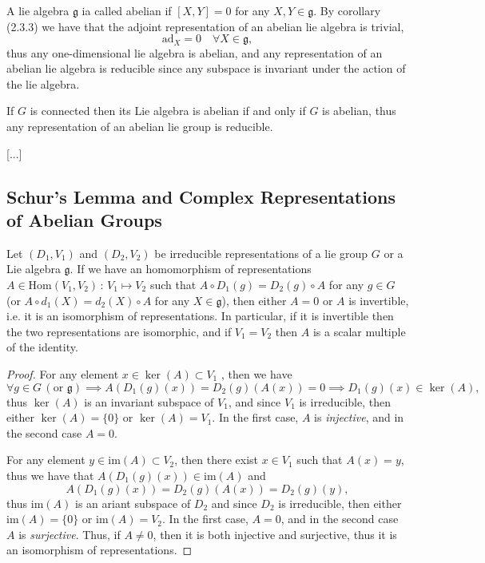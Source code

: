 \begin{definition}
    A lie algebra \(\mathfrak{g}\) ia called abelian if \([X, Y] = 0\) for any \(X, Y \in \mathfrak{g}\). By corollary (2.3.3) we have that the adjoint representation of an abelian lie algebra is trivial,
    \[
        \mathrm{ad}_X = 0 \quad \forall X \in \mathfrak{g},
    \]
    thus any one-dimensional lie algebra is abelian, and any representation of an abelian lie algebra is reducible since any subspace is invariant under the action of the lie algebra. 
\end{definition}

If \(G\) is connected then its Lie algebra is abelian if and only if \(G\) is abelian, thus any representation of an abelian lie group is reducible.

    [...]

\subsection{Schur's Lemma and Complex Representations of Abelian Groups}

\begin{theorem}
    Let \((D_1, V_1)\) and \((D_{2}, V_2 )\) be irreducible representations of a lie group \(G\) or a Lie algebra \(\mathfrak{g}\). If we have an homomorphism of representations \(A \in \text{Hom}(V_1, V_2) \,:\, V_1 \mapsto V_2\) such that \(A \circ D_1(g) = D_2(g) \circ A\) for any \(g \in G\) (or \(A \circ d_1(X) = d_2(X) \circ A\) for any \(X \in \mathfrak{g}\)), then either \(A = 0\) or \(A\) is invertible, i.e. it is an isomorphism of representations. In particular, if it is invertible then the two representations are isomorphic, and if \(V_1 = V_2\) then \(A\) is a scalar multiple of the identity.
\end{theorem}
\begin{proof}
    For any element \(x \in \ker(A) \subset V_1\) , then we have
    \[
        \forall g \in G \, ( \text{or } \mathfrak{g}) \implies A(D_1(g)(x)) = D_2(g)(A(x)) = 0 \implies D_1(g)(x) \in \ker(A),
    \]
    thus \(\ker(A)\) is an invariant subspace of \(V_1\), and since \(V_1\) is irreducible, then either \(\ker(A) = \{0\}\) or \(\ker(A) = V_1\). In the first case, \(A\) is \textit{injective}, and in the second case \(A = 0\).

    For any element \(y \in \text{im}(A) \subset V_2\), then there exist \(x \in V_1\) such that \(A(x) = y\), thus we have that \(A(D_1(g)(x)) \in \text{im}(A)\) and
    \[
        A(D_1(g)(x)) = D_2(g)(A(x)) = D_2(g)(y),
    \]
    thus \(\text{im}(A)\) is an ariant subspace of \(D_2\) and since \(D_2\) is irreducible, then either \(\text{im}(A) = \{0\}\) or \(\text{im}(A) = V_2\). In the first case, \(A = 0\), and in the second case \(A\) is \textit{surjective}. Thus, if \(A \neq 0\), then it is both injective and surjective, thus it is an isomorphism of representations.
\end{proof}


